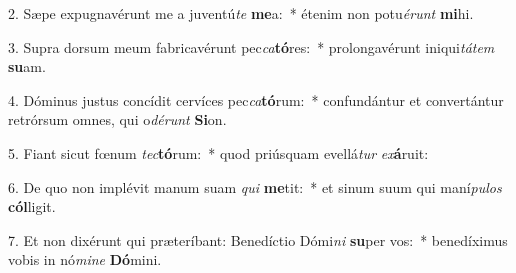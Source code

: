 2. Sæpe expugnavérunt me a juventú\textit{te} \textbf{me}a:~*  étenim non potu\textit{é}\textit{runt} \textbf{mi}hi.\

3. Supra dorsum meum fabricavérunt pec\textit{ca}\textbf{tó}res:~*  prolongavérunt iniqui\textit{tá}\textit{tem} \textbf{su}am.\

4. Dóminus justus concídit cervíces pec\textit{ca}\textbf{tó}rum:~*  confundántur et convertántur retrórsum omnes, qui o\textit{dé}\textit{runt} \textbf{Si}on.\

5. Fiant sicut fœnum \textit{tec}\textbf{tó}rum:~*  quod priúsquam evellá\textit{tur} \textit{ex}\textbf{á}ruit:\

6. De quo non implévit manum suam \textit{qui} \textbf{me}tit:~*  et sinum suum qui maní\textit{pu}\textit{los} \textbf{cól}ligit.\

7. Et non dixérunt qui præteríbant: Benedíctio Dómi\textit{ni} \textbf{su}per vos:~*  benedíximus vobis in nó\textit{mi}\textit{ne} \textbf{Dó}mini.\

